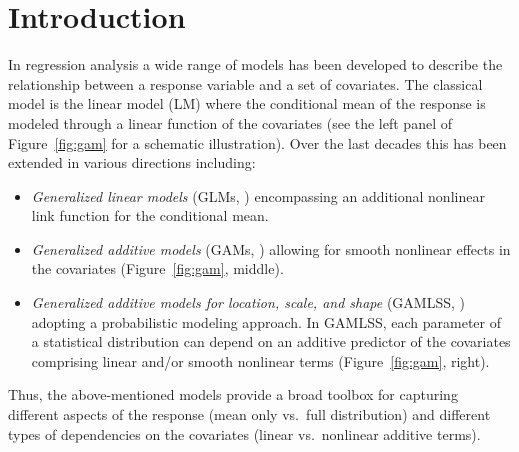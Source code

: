 \documentclass[aoas, preprint]{imsart}
\numberwithin{equation}{subsection}
\begin{document}
\section{Introduction}
\label{sec:introduction}

In regression analysis a wide range of models has been developed to describe the
relationship between a response variable and a set of covariates. The classical
model is the linear model (LM) where the conditional mean of the response
is modeled through a linear function of the covariates (see the left panel of
Figure~\ref{fig:gam} for a schematic illustration). Over the last decades
this has been extended in various directions including:


\begin{itemize}
  \item \emph{Generalized linear models} (GLMs, \citealp{Nelder+Wedderburn:1972})
    encompassing an additional nonlinear link function for the conditional mean.
  \item \emph{Generalized additive models} (GAMs, \citealp{Hastie+Tibshirani:1986})
    allowing for smooth nonlinear effects in the covariates
    (Figure~\ref{fig:gam}, middle).
  \item \emph{Generalized additive models for location, scale, and shape}
    (GAMLSS, \citealp{Rigby+Stasinopoulos:2005}) adopting a probabilistic modeling
    approach. In GAMLSS, each parameter of a statistical distribution can depend
    on an additive predictor of the covariates comprising linear and/or
    smooth nonlinear terms (Figure~\ref{fig:gam}, right).
\end{itemize}
Thus, the above-mentioned models provide a broad toolbox for capturing different
aspects of the response (mean only vs.\ full distribution) and different types
of dependencies on the covariates (linear vs.\ nonlinear additive terms).
\end{document}
